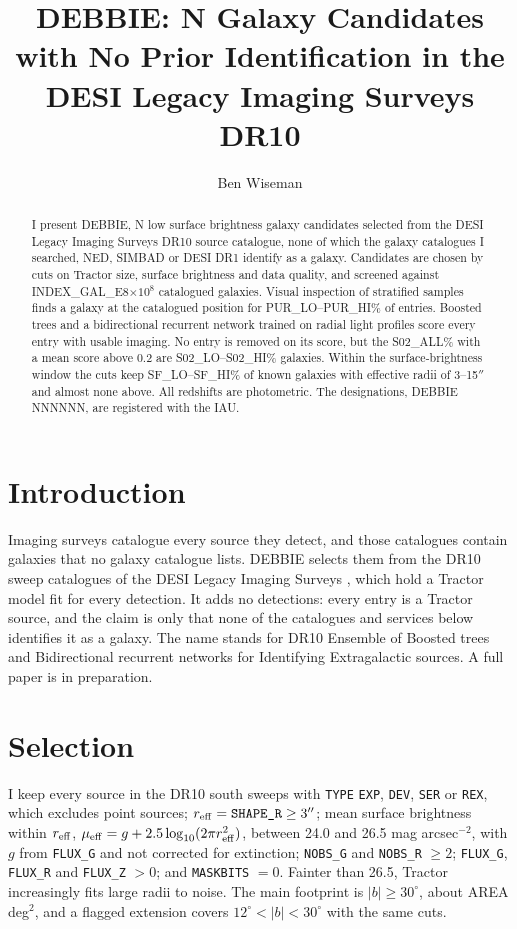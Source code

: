 \documentclass{aastex701}
\begin{document}
\title{DEBBIE: {{N}} Galaxy Candidates with No Prior Identification in the DESI Legacy Imaging Surveys DR10}

\author{Ben Wiseman}

\begin{abstract}
I present DEBBIE, {{N}} low surface brightness galaxy candidates selected from
the DESI Legacy Imaging Surveys DR10 source catalogue, none of which the galaxy
catalogues I searched, NED, SIMBAD or DESI DR1 identify as a galaxy. Candidates are chosen
by cuts on Tractor size, surface brightness and data quality, and screened
against {{INDEX_GAL_E8}}$\times10^{8}$ catalogued galaxies. Visual inspection of
stratified samples finds a galaxy at the catalogued position for
{{PUR_LO}}--{{PUR_HI}}\% of entries. Boosted trees and a bidirectional recurrent
network trained on radial light profiles score every entry with usable imaging.
No entry is removed on its score, but the {{S02_ALL}}\% with a mean score above 0.2 are
{{S02_LO}}--{{S02_HI}}\% galaxies. Within the surface-brightness window the
cuts keep {{SF_LO}}--{{SF_HI}}\% of known galaxies with effective radii of
3--15$''$ and almost none above. All redshifts are photometric. The
designations, DEBBIE NNNNNN, are registered with the IAU.
\end{abstract}

\section{Introduction}

Imaging surveys catalogue every source they detect, and those catalogues
contain galaxies that no galaxy catalogue lists. DEBBIE selects them from the
DR10 sweep catalogues of the DESI Legacy Imaging Surveys \citep{dey2019}, which
hold a Tractor model fit \citep{lang2016} for every detection. It adds no
detections: every entry is a Tractor source, and the claim is only that none of
the catalogues and services below identifies it as a galaxy. The name
stands for DR10 Ensemble of Boosted trees and Bidirectional recurrent networks
for Identifying Extragalactic sources. A full paper is in preparation.

\section{Selection}

I keep every source in the DR10 south sweeps with \texttt{TYPE} \texttt{EXP},
\texttt{DEV}, \texttt{SER} or \texttt{REX}, which excludes point sources;
$r_{\rm eff} = \texttt{SHAPE\_R} \ge 3''$; mean surface brightness within
$r_{\rm eff}$, $\mu_{\rm eff} = g + 2.5\log_{10}(2\pi r_{\rm eff}^2)$, between
24.0 and 26.5 mag arcsec$^{-2}$, with $g$ from \texttt{FLUX\_G} and not corrected
for extinction; \texttt{NOBS\_G} and \texttt{NOBS\_R} $\ge 2$; \texttt{FLUX\_G},
\texttt{FLUX\_R} and \texttt{FLUX\_Z} $> 0$; and \texttt{MASKBITS} $= 0$. Fainter
than 26.5, Tractor increasingly fits large radii to noise. The main footprint is
$|b| \ge 30^\circ$, about {{AREA}} deg$^2$, and a flagged extension covers
$12^\circ < |b| < 30^\circ$ with the same cuts.
\end{document}
